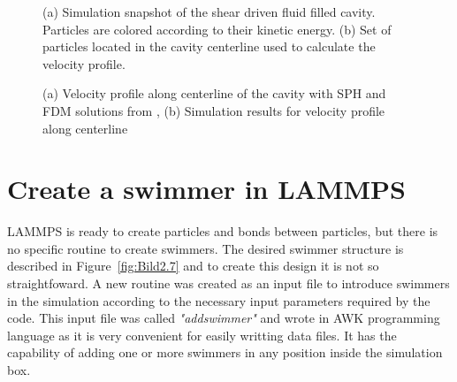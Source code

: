 \begin{figure}[ht]
\centering
  \begin{footnotesize}
  
  \caption[(a) Simulation snapshot of the shear driven fluid filled cavity. Particles are colored according to their kinetic energy. (b) Set of particles located in the cavity centerline used to calculate the velocity profile.]{(a) Simulation snapshot of the shear driven fluid filled cavity. Particles are colored according to their kinetic energy. (b) Set of particles located in the cavity centerline used to calculate the velocity profile.}
  \label{fig:Bild3.1}
  \end{footnotesize}
\end{figure} 



\begin{figure}[H]
\centering
  \begin{footnotesize}
  
  \caption[(a) Velocity profile along centerline of the cavity with SPH and FDM solutions from \cite{neece_tait_1968} , (b) Simulation results for velocity profile along centerline ]{(a) Velocity profile along centerline of the cavity with SPH and FDM solutions from \cite{neece_tait_1968} , (b) Simulation results for velocity profile along centerline }
  \label{fig:Bild3.2}
  \end{footnotesize}
\end{figure} 



\section{Create a swimmer in LAMMPS}
\label{sec:section 2}

LAMMPS is ready to create particles and bonds between particles, but there is no specific routine to create swimmers. The desired swimmer structure is described in Figure~\ref{fig:Bild2.7}
and to create this design it is not so straightfoward. A new routine was created as an input file to introduce swimmers in the simulation according to the necessary input parameters
required by the code. This input file was called \textit{"addswimmer"} and wrote in AWK programming language as it is very convenient for easily writting data files. It has 
the capability of adding one or more swimmers in any position inside the simulation box.\par

